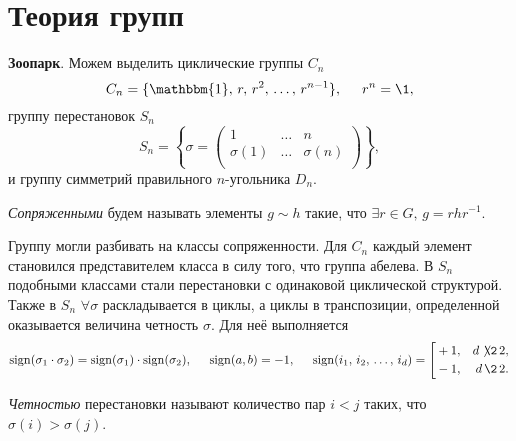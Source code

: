\section{Теория групп}


\textbf{Зоопарк}. Можем выделить циклические группы $C_n$
\begin{equation*}
	C_n = \{\mathbbm{1},\, r,\, r^2,\, \ldots,\, r^{n-1}\},
	\hspace{5 mm} 
	r^{n} = \1,
\end{equation*}
группу перестановок $S_n$
\begin{equation*}
	S_n = \left\{\sigma = \begin{pmatrix}
	    1 & \ldots & n  \\
	    \sigma(1) & \ldots & \sigma(n)  \\
	\end{pmatrix}\right\},
\end{equation*}
и группу симметрий правильного $n$-угольника $D_n$. 

\begin{to_def}
    \textit{Сопряженными} будем называть элементы $g \sim h$ такие, что $\exists r \in G,\, g = r h r^{-1}$.
\end{to_def}

Группу могли разбивать на классы сопряженности. Для $C_n$ каждый элемент становился представителем класса в силу того, что группа абелева. В $S_n$ подобными классами стали перестановки с одинаковой циклической структурой. Также в $S_n$ $\forall  \sigma$ раскладывается в циклы, а циклы в транспозиции, определенной оказывается величина четность $\sigma$. Для неё выполняется
\begin{equation*}
	\sign(\sigma_1 \cdot \sigma_2) = \sign(\sigma_1) \cdot \sign(\sigma_2),
	\hspace{5 mm} 
	\sign(a, b) = -1,
	\hspace{5 mm} 
	\sign(i_1,\, i_2,\, \ldots,\, i_d) = \left[\begin{aligned}
	    &+1, & d\not{\hspace{-1.5pt}\2}\, 2,\\
	    &-1, & d \,\2\, 2.
	\end{aligned}\right.
\end{equation*}

\begin{to_def}
    \textit{Четностью} перестановки называют количество пар $i < j$ таких, что $\sigma(i) > \sigma(j)$. 
\end{to_def}

